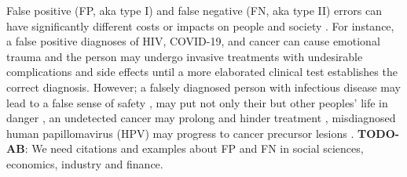 \documentclass{article}
\newcommand{\todo}[2]{{\color{red} {\bf TODO-#1}: #2}}
\begin{document}
False positive (FP, aka type I) and false negative (FN, aka type II) errors can have significantly different costs or impacts on people and society \cite{wynants2019three}. For instance, a false positive diagnoses of HIV, COVID-19, and cancer can cause emotional trauma and the person may undergo invasive treatments with undesirable complications and side effects \cite{newman2021rate, salz2010meta, Tosteson2014Consequences, xu2016frequency} until a more elaborated clinical test establishes the correct diagnosis. However; a falsely diagnosed person with infectious disease may lead to a false sense of safety \cite{mouliou2021false}, may put not only their but other peoples' life in danger \cite{woloshin2020false}, an undetected cancer may prolong and hinder treatment \cite{bradley2021interpreting}, misdiagnosed human papillomavirus (HPV) may progress to cancer precursor lesions \cite{macios2022false,pinsky2015principles}. \todo{AB}{We need citations and examples about FP and FN in social sciences, economics, industry and finance}.

\end{document}
